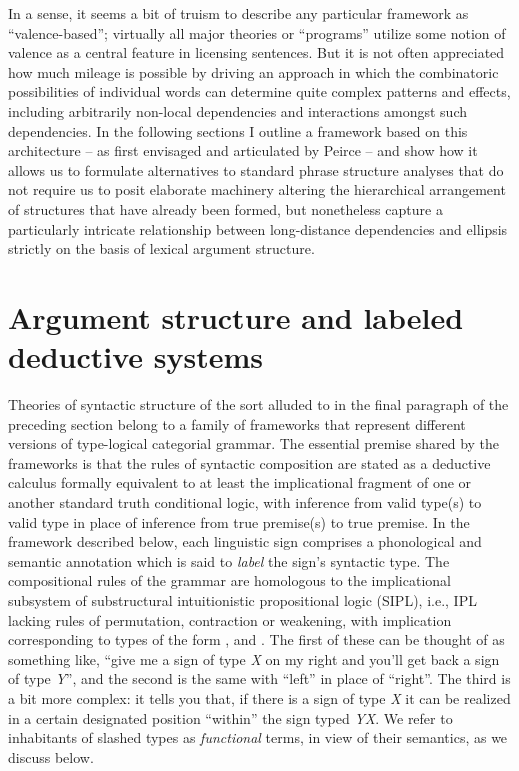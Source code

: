 \documentclass[output=paper,colorlinks,citecolor=brown]{langscibook}
\begin{document}
In a sense, it seems a bit of truism to describe any particular
framework as ``valence-based''; virtually all major theories or
``programs'' utilize some notion of valence as a central feature in
licensing sentences. But it is not often appreciated how much mileage
is possible by driving an approach in which the combinatoric
possibilities of individual words can determine quite complex
patterns and effects, including arbitrarily non-local dependencies and
interactions amongst such dependencies. In the following sections I
outline a framework based on this architecture -- as first envisaged
and articulated by Peirce -- and show how it allows us to formulate
alternatives to standard phrase structure analyses that do not require
us to posit elaborate machinery altering the hierarchical arrangement
of structures that have already been formed, but nonetheless capture a
particularly intricate relationship between long-distance dependencies
and ellipsis strictly on the basis of lexical argument structure.



\section{Argument structure and labeled deductive systems\label{sec:argstruc}}

Theories of syntactic structure of the sort alluded to in the final
paragraph of the preceding section belong to a family of frameworks
that represent different versions of type-logical categorial grammar.
The essential premise shared by the frameworks is that the rules of
syntactic composition are stated as a deductive calculus formally
equivalent to at least the implicational fragment of one or another
standard truth conditional logic, with inference from valid type(s) to
valid type in place of inference from true premise(s) to true
premise. In the framework described below, each linguistic sign
comprises a phonological and semantic annotation which is said to
\textsl{label} the sign's syntactic type. The compositional rules of
the grammar are homologous to the implicational subsystem of
substructural intuitionistic propositional logic (SIPL), i.e.,
IPL lacking rules of permutation, contraction or weakening, with implication
corresponding to types of the form ,  and . The
first of these can be thought of as something like, ``give me a sign of
type \textit{X} on my right and you'll get back a sign of type  \textit{Y}'', and the
second is the same with ``left'' in place of ``right''. The third is a bit
more complex: it tells you that, if there is a sign of type \textit{X} it can be
realized in a certain designated position ``within'' the sign typed
\textit{Y}\vs\textit{X}. We refer to inhabitants of slashed types as
\textsl{functional} terms, in view of their semantics, as we discuss below.
\end{document}
